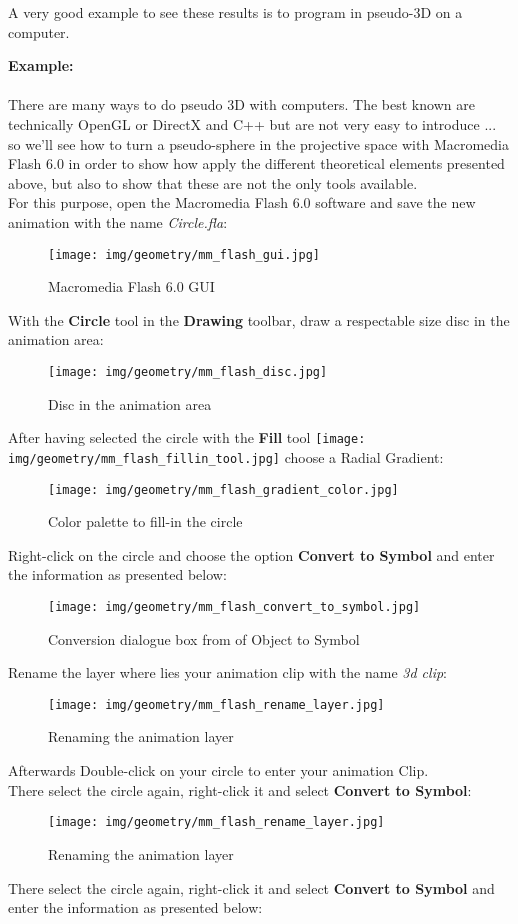 	A very good example to see these results is to program in pseudo-3D on a computer.
	\begin{tcolorbox}[colframe=black,colback=white,sharp corners]
	\textbf{{\Large {}}Example:}\\\\
	There are many ways to do pseudo 3D with computers. The best known are technically OpenGL or DirectX and C++ but are not very easy to introduce ... so we'll see how to turn a pseudo-sphere in the projective space with Macromedia Flash 6.0 in order to show how apply the different theoretical elements presented above, but also to show that these are not the only tools available.\\
	
	For this purpose, open the Macromedia Flash 6.0 software and save the new animation with the name \textit{Circle.fla}:
	\begin{figure}[H]
		\centering
		\texttt{[image: img/geometry/mm\_flash\_gui.jpg]}
		\caption[]{Macromedia Flash 6.0 GUI}
	\end{figure}
	With the \textbf{Circle} tool in the \textbf{Drawing} toolbar, draw a respectable size disc in the animation area:
	\begin{figure}[H]
		\centering
		\texttt{[image: img/geometry/mm\_flash\_disc.jpg]}
		\caption[]{Disc in the animation area}
	\end{figure}
	\end{tcolorbox}
	\begin{tcolorbox}[colframe=black,colback=white,sharp corners]
	After having selected the circle with the \textbf{Fill} tool \texttt{[image: img/geometry/mm\_flash\_fillin\_tool.jpg]} choose a Radial Gradient:
	\begin{figure}[H]
		\centering
		\texttt{[image: img/geometry/mm\_flash\_gradient\_color.jpg]}
		\caption[]{Color palette to fill-in the circle}
	\end{figure}
	Right-click on the circle and choose the option \textbf{Convert to Symbol} and enter the information as presented below:
	\begin{figure}[H]
		\centering
		\texttt{[image: img/geometry/mm\_flash\_convert\_to\_symbol.jpg]}
		\caption[]{Conversion dialogue box from of Object to Symbol}
	\end{figure}
	Rename the layer where lies your animation clip with the name \textit{3d clip}:
	\begin{figure}[H]
		\centering
		\texttt{[image: img/geometry/mm\_flash\_rename\_layer.jpg]}
		\caption[]{Renaming the animation layer}
	\end{figure}
	Afterwards Double-click on your circle to enter your animation Clip.\\
	
	There select the circle again, right-click it and select \textbf{Convert to Symbol}:
	\begin{figure}[H]
		\centering
		\texttt{[image: img/geometry/mm\_flash\_rename\_layer.jpg]}
		\caption[]{Renaming the animation layer}
	\end{figure}
	There select the circle again, right-click it and select \textbf{Convert to Symbol} and enter the information as presented below:
	\end{tcolorbox}
	
